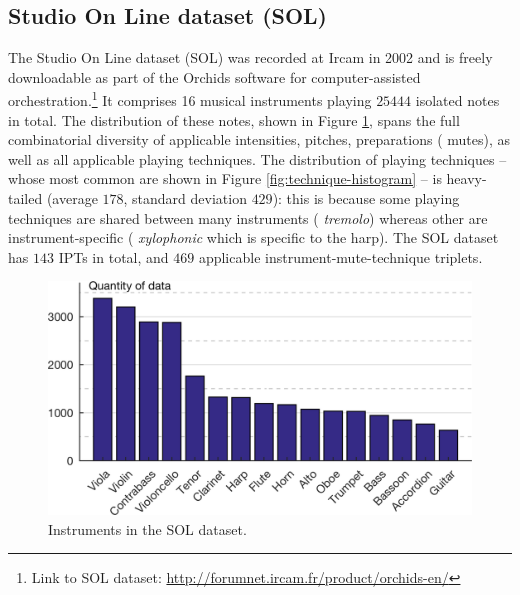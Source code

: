 \subsection{Studio On Line dataset (SOL)}
The Studio On Line dataset (SOL) was recorded at Ircam in 2002 and is freely downloadable as part of the Orchids software for computer-assisted orchestration.\footnote{Link to SOL dataset: \url{http://forumnet.ircam.fr/product/orchids-en/}}
It comprises 16 musical instruments playing $25444$ isolated notes in total.
The distribution of these notes, shown in Figure \ref{fig:instrument-histogram}, spans the full combinatorial diversity of applicable intensities, pitches, preparations (\ie{} mutes), as well as all applicable playing techniques.
The distribution of playing techniques -- whose most common are shown in Figure \ref{fig:technique-histogram} -- is heavy-tailed (average $178$, standard deviation $429$): this is because some playing techniques are shared between many instruments (\eg{} \textit{tremolo}) whereas other are instrument-specific (\eg{} \textit{xylophonic} which is specific to the harp).
The SOL dataset has $143$ IPTs in total, and $469$ applicable instrument-mute-technique triplets.

\begin{figure}[t!]
\centering
\includegraphics[width=\linewidth]{./figs/histogram/histogram_instruments.png}
\caption{Instruments in the SOL dataset.}
\label{fig:instrument-histogram}
\end{figure}

